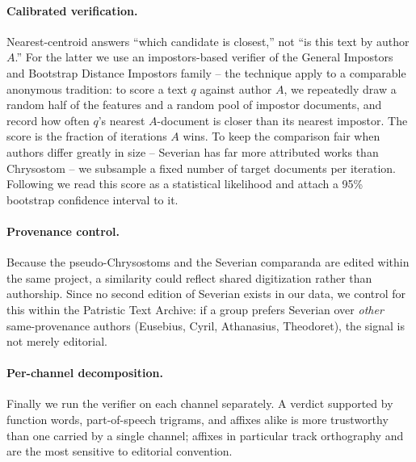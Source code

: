 \documentclass{anthology-ch}
\begin{document}
\paragraph{Calibrated verification.} Nearest-centroid answers ``which candidate is closest,'' not ``is this text by author $A$.'' For the latter we use an impostors-based verifier of the General Impostors \cite{koppel2014,kestemont2016} and Bootstrap Distance Impostors \cite{nagy2024} family -- the technique \textcite{clerice2025} apply to a comparable anonymous tradition: to score a text $q$ against author $A$, we repeatedly draw a random half of the features and a random pool of impostor documents, and record how often $q$'s nearest $A$-document is closer than its nearest impostor. The score is the fraction of iterations $A$ wins. To keep the comparison fair when authors differ greatly in size -- Severian has far more attributed works than Chrysostom -- we subsample a fixed number of target documents per iteration. Following \textcite{nagy2024} we read this score as a statistical likelihood and attach a 95\% bootstrap confidence interval to it.

\paragraph{Provenance control.} Because the pseudo-Chrysostoms and the Severian comparanda are edited within the same project, a similarity could reflect shared digitization rather than authorship. Since no second edition of Severian exists in our data, we control for this within the Patristic Text Archive: if a group prefers Severian over \emph{other} same-provenance authors (Eusebius, Cyril, Athanasius, Theodoret), the signal is not merely editorial.

\paragraph{Per-channel decomposition.} Finally we run the verifier on each channel separately. A verdict supported by function words, part-of-speech trigrams, and affixes alike is more trustworthy than one carried by a single channel; affixes in particular track orthography and are the most sensitive to editorial convention.
\end{document}
